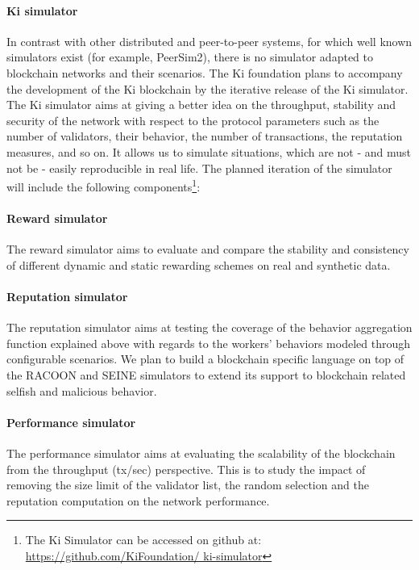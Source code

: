 \paragraph{Ki simulator} In contrast with other distributed and peer-to-peer systems, for which well known simulators exist (for example, PeerSim2), there is no simulator adapted to blockchain networks and their scenarios. The Ki foundation plans to accompany the development of the Ki blockchain by the iterative release of the Ki simulator. The Ki simulator aims at giving a better idea on the throughput, stability and security of the network with respect to the protocol parameters such as the number of validators, their behavior, the number of transactions, the reputation measures, and so on. It allows us to simulate situations, which are not - and must not be - easily reproducible in real life. The planned iteration of the simulator will include the following components\footnote{The Ki Simulator can be accessed on github at: \url{https://github.com/KiFoundation/ ki-simulator}}:

\paragraph{Reward simulator} The reward simulator aims to evaluate and compare the stability and consistency of different dynamic and static rewarding schemes on real and synthetic data.

\paragraph{Reputation simulator} The reputation simulator aims at testing the coverage of the behavior aggregation function explained above with regards to the workers' behaviors modeled through configurable scenarios. We plan to build a blockchain specific language on top of the RACOON\cite{lenacota2015} and SEINE simulators\cite{cota2017analysing} to extend its support to blockchain related selfish and malicious behavior.

\paragraph{Performance simulator} The performance simulator aims at evaluating the scalability of the blockchain from the throughput (tx/sec) perspective. This is to study the impact of removing the size limit of the validator list, the random selection and the reputation computation on the network performance.\\

